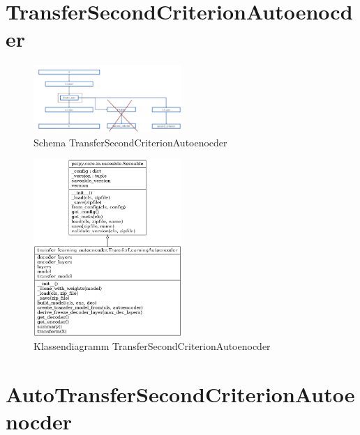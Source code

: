 	\section{TransferSecondCriterionAutoenocder}
	\label{sec:TransferSecondCriterionAutoenocder}

	\begin{figure}[h]
		\centering
		\includegraphics[width=0.5\textwidth, center]{bilder/Schema_Autoencoders/Schema_TSCAE.png}
		\caption[Schema TransferSecondCriterionAutoenocder]{Schema TransferSecondCriterionAutoenocder}
		\label{img:SchemaTSCAE}
	\end{figure}  

	
	\begin{figure}[h]
		\centering
		\includegraphics[width=0.5\textwidth, center]{bilder/Klassendiagramme/Klassendiagramm_TLCSCAE.png}
		\caption[Klassendiagramm TransferSecondCriterionAutoenocder]{Klassendiagramm TransferSecondCriterionAutoenocder}
		\label{img:KlassendiagrammTransferSecondCriterionAutoenocder}
	\end{figure}  
			
	\section{AutoTransferSecondCriterionAutoenocder}
	\label{sec:AutoTransferSecondCriterionAutoenocder}


